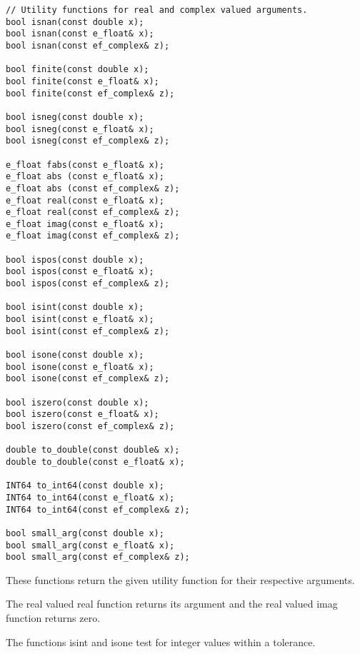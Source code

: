 \begin{lstlisting}
// Utility functions for real and complex valued arguments.
bool isnan(const double x);
bool isnan(const e_float& x);
bool isnan(const ef_complex& z);

bool finite(const double x);
bool finite(const e_float& x);
bool finite(const ef_complex& z);

bool isneg(const double x);
bool isneg(const e_float& x);
bool isneg(const ef_complex& z);

e_float fabs(const e_float& x);
e_float abs (const e_float& x);
e_float abs (const ef_complex& z);
e_float real(const e_float& x);
e_float real(const ef_complex& z);
e_float imag(const e_float& x);
e_float imag(const ef_complex& z);

bool ispos(const double x);
bool ispos(const e_float& x);
bool ispos(const ef_complex& z);

bool isint(const double x);
bool isint(const e_float& x);
bool isint(const ef_complex& z);

bool isone(const double x);
bool isone(const e_float& x);
bool isone(const ef_complex& z);

bool iszero(const double x);
bool iszero(const e_float& x);
bool iszero(const ef_complex& z);

double to_double(const double& x);
double to_double(const e_float& x);

INT64 to_int64(const double x);
INT64 to_int64(const e_float& x);
INT64 to_int64(const ef_complex& z);

bool small_arg(const double x);
bool small_arg(const e_float& x);
bool small_arg(const ef_complex& z);
\end{lstlisting}

\vspace{6.0pt}

 These functions return the given utility function
for their respective arguments.

\vspace{6.0pt}

 The real valued {\courier real} function returns its argument
and the real valued {\courier imag} function returns zero.

\vspace{6.0pt}

 The functions {\courier isint} and {\courier isone}
test for integer values within a tolerance.

\vspace{6.0pt}

